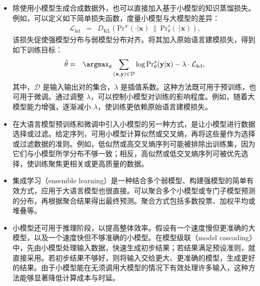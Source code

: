 \begin{itemize}
\item \vspace{0.5em} 除使用小模型生成合成数据外，也可以直接加入基于小模型的知识蒸馏损失。例如，可以定义如下简单损失函数，度量小模型与大模型的差异：
    \begin{eqnarray}
    \mathcal{L}_{\mathrm{kd}} & = & D_{\mathrm{KL}}(\mathrm{Pr}^{w}(\cdot|\mathbf{x})\ \|\ \mathrm{Pr}^{s}_{\theta}(\cdot|\mathbf{x})),
    \end{eqnarray}
    \noindent 该损失促使强模型分布与弱模型分布对齐。将其加入原始语言建模损失，得到如下训练目标：
    \begin{eqnarray}
    \tilde{\theta} & = & \argmax_{\theta} \sum_{(\mathbf{x},\mathbf{y}) \in \mathcal{D}} \log \mathrm{Pr}_{\theta}^{s}(\mathbf{y}|\mathbf{x}) - \lambda \cdot \mathcal{L}_{\mathrm{kd}},
    \end{eqnarray}
    \noindent 其中，$\mathcal{D}$ 是输入输出对的集合，$\lambda$ 是插值系数。这种方法既可用于预训练，也可用于微调。通过调整 $\lambda$，可以控制小模型对训练的影响程度。例如，随着大模型能力增强，逐渐减小 $\lambda$，使训练更依赖原始语言建模损失。
\item \vspace{0.3em} 在大语言模型预训练和微调中引入小模型的另一种方式，是让小模型进行数据选择或过滤。给定序列，可用小模型计算似然或交叉熵，再将这些量作为选择或过滤数据的准则。例如，低似然或高交叉熵序列可能被排除出训练集，因为它们与小模型所学分布不够一致；相反，高似然或低交叉熵序列可被优先选择，使训练聚焦更相关或更高质量的数据。
\item \vspace{0.3em} 集成学习（ensemble learning）是一种结合多个弱模型、构建强模型的简单有效方式，应用于大语言模型也很直接。可以聚合多个小模型或专门子模型预测的分布，再根据聚合结果得出最终预测。聚合方式包括多数投票、加权平均或堆叠等。
\item \vspace{0.3em} 小模型还可用于推理阶段，以提高整体效率。假设有一个速度慢但更准确的大模型，以及一个速度快但不够准确的小模型。在模型级联（model cascading）中，先由小模型处理输入数据，快速生成初步结果；若结果满足预设准则，就直接采用。若初步结果不够好，则将输入交给更大、更准确的模型，生成更好的结果。由于小模型能在无须调用大模型的情况下有效处理许多输入，这种方法能够显著降低计算成本与时延。
\end{itemize}
\vspace{0.5em}


